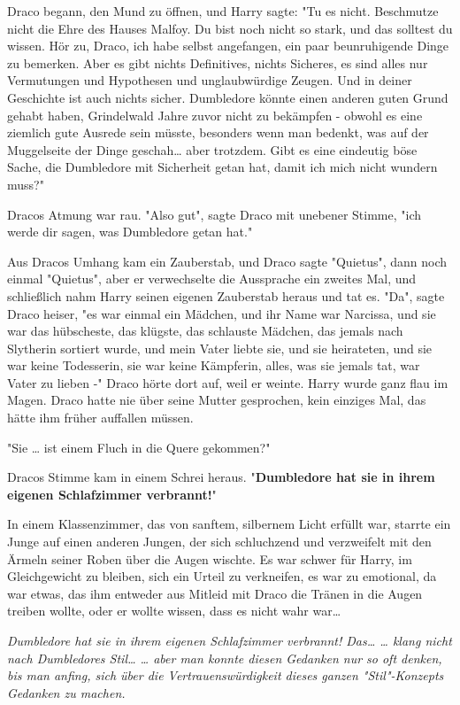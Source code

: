 {Draco begann, den Mund zu öffnen, und Harry sagte: "Tu es nicht. Beschmutze nicht die Ehre des Hauses Malfoy. Du bist noch nicht so stark, und das solltest du wissen. Hör zu, Draco, ich habe selbst angefangen, ein paar beunruhigende Dinge zu bemerken. Aber es gibt nichts Definitives, nichts Sicheres, es sind alles nur Vermutungen und Hypothesen und unglaubwürdige Zeugen. Und in deiner Geschichte ist auch nichts sicher. Dumbledore könnte einen anderen guten Grund gehabt haben, Grindelwald Jahre zuvor nicht zu bekämpfen - obwohl es eine ziemlich gute Ausrede sein müsste, besonders wenn man bedenkt, was auf der Muggelseite der Dinge geschah… aber trotzdem. Gibt es eine eindeutig böse Sache, die Dumbledore mit Sicherheit getan hat, damit ich mich nicht wundern muss?"

Dracos Atmung war rau. "Also gut", sagte Draco mit unebener Stimme, "ich werde dir sagen, was Dumbledore getan hat."

Aus Dracos Umhang kam ein Zauberstab, und Draco sagte "Quietus", dann noch einmal "Quietus", aber er verwechselte die Aussprache ein zweites Mal, und schließlich nahm Harry seinen eigenen Zauberstab heraus und tat es. "Da", sagte Draco heiser, "es war einmal ein Mädchen, und ihr Name war Narcissa, und sie war das hübscheste, das klügste, das schlauste Mädchen, das jemals nach Slytherin sortiert wurde, und mein Vater liebte sie, und sie heirateten, und sie war keine Todesserin, sie war keine Kämpferin, alles, was sie jemals tat, war Vater zu lieben -" Draco hörte dort auf, weil er weinte. Harry wurde ganz flau im Magen. Draco hatte nie über seine Mutter gesprochen, kein einziges Mal, das hätte ihm früher auffallen müssen.

"Sie … ist einem Fluch in die Quere gekommen?"

Dracos Stimme kam in einem Schrei heraus. "\textbf{Dumbledore hat sie in ihrem eigenen Schlafzimmer verbrannt!}"

In einem Klassenzimmer, das von sanftem, silbernem Licht erfüllt war, starrte ein Junge auf einen anderen Jungen, der sich schluchzend und verzweifelt mit den Ärmeln seiner Roben über die Augen wischte. Es war schwer für Harry, im Gleichgewicht zu bleiben, sich ein Urteil zu verkneifen, es war zu emotional, da war etwas, das ihm entweder aus Mitleid mit Draco die Tränen in die Augen treiben wollte, oder er wollte wissen, dass es nicht wahr war…

\emph{Dumbledore hat sie in ihrem eigenen Schlafzimmer verbrannt! Das… … klang nicht nach Dumbledores Stil… … aber man konnte diesen Gedanken nur so oft denken, bis man anfing, sich über die Vertrauenswürdigkeit dieses ganzen "Stil"-Konzepts Gedanken zu machen.}

}
